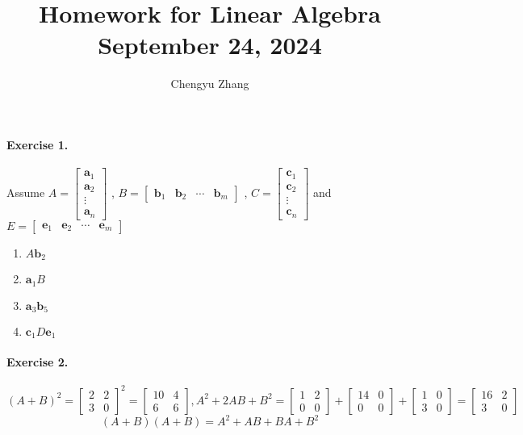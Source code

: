 \documentclass{article}
\title{\vspace*{-3.5cm}Homework for Linear Algebra \\September 24, 2024}
\author{Chengyu Zhang}
\date{}
\begin{document}
\maketitle

\paragraph{Exercise 1.}
Assume $ A = 
    \begin{bmatrix}
    \mathbf{a}_1\\ \mathbf{a}_2\\ \vdots \\ \mathbf{a}_n
    \end{bmatrix} $ , $ B =
    \begin{bmatrix}
    \mathbf{b}_1 & \mathbf{b}_2 & \cdots & \mathbf{b}_m
    \end{bmatrix} $ , $ C = 
    \begin{bmatrix}
    \mathbf{c}_1\\ \mathbf{c}_2\\ \vdots \\ \mathbf{c}_n
    \end{bmatrix} $ and $ E =
    \begin{bmatrix}
    \mathbf{e}_1 & \mathbf{e}_2 & \cdots & \mathbf{e}_m
    \end{bmatrix} $\\
    \begin{enumerate}
        \item $ A\mathbf{b}_2$
        \item $ \mathbf{a}_1 B$
        \item $\mathbf{a}_3 \mathbf{b}_5$
        \item $\mathbf{c}_1 D \mathbf{e}_1$
    \end{enumerate}
\paragraph{Exercise 2.}
    \[
        (A+B)^2 =
        \begin{bmatrix}
             2 & 2 \\ 3 & 0
        \end{bmatrix}^2 = 
        \begin{bmatrix}
             10 & 4 \\ 6 & 6
        \end{bmatrix},
        A^2+2AB+B^2 =
        \begin{bmatrix}
            1 & 2 \\ 0 & 0
        \end{bmatrix} + 
        \begin{bmatrix}
            14 & 0 \\ 0 & 0
        \end{bmatrix} +
        \begin{bmatrix}
            1 & 0 \\ 3 & 0
        \end{bmatrix} =
        \begin{bmatrix}
            16 & 2 \\ 3 & 0
        \end{bmatrix}
    \]
    \[
        (A+B)(A+B)= A^2 + AB + BA + B^2
    \]
\end{document}

